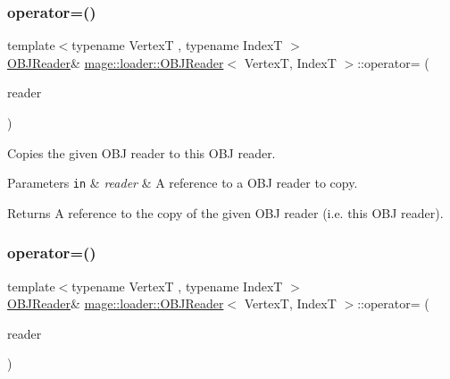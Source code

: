 \subsubsection{\texorpdfstring{operator=()}{operator=()}\hspace{0.1cm}{\footnotesize\ttfamily [1/2]}}
{\footnotesize\ttfamily template$<$typename VertexT , typename IndexT $>$ \\
\hyperlink{classmage_1_1loader_1_1_o_b_j_reader}{O\+B\+J\+Reader}\& \hyperlink{classmage_1_1loader_1_1_o_b_j_reader}{mage\+::loader\+::\+O\+B\+J\+Reader}$<$ VertexT, IndexT $>$\+::operator= (\begin{DoxyParamCaption}\item[{const \hyperlink{classmage_1_1loader_1_1_o_b_j_reader}{O\+B\+J\+Reader}$<$ VertexT, IndexT $>$ \&}]{reader }\end{DoxyParamCaption})\hspace{0.3cm}{\ttfamily [delete]}}

Copies the given O\+BJ reader to this O\+BJ reader.


\begin{DoxyParams}[1]{Parameters}
\mbox{\tt in}  & {\em reader} & A reference to a O\+BJ reader to copy. \\
\hline
\end{DoxyParams}
\begin{DoxyReturn}{Returns}
A reference to the copy of the given O\+BJ reader (i.\+e. this O\+BJ reader). 
\end{DoxyReturn}
\hypertarget{classmage_1_1loader_1_1_o_b_j_reader_a0dc19f003490ad91b6ed9ee8365e3bd4}{}\label{classmage_1_1loader_1_1_o_b_j_reader_a0dc19f003490ad91b6ed9ee8365e3bd4} 
\subsubsection{\texorpdfstring{operator=()}{operator=()}\hspace{0.1cm}{\footnotesize\ttfamily [2/2]}}
{\footnotesize\ttfamily template$<$typename VertexT , typename IndexT $>$ \\
\hyperlink{classmage_1_1loader_1_1_o_b_j_reader}{O\+B\+J\+Reader}\& \hyperlink{classmage_1_1loader_1_1_o_b_j_reader}{mage\+::loader\+::\+O\+B\+J\+Reader}$<$ VertexT, IndexT $>$\+::operator= (\begin{DoxyParamCaption}\item[{\hyperlink{classmage_1_1loader_1_1_o_b_j_reader}{O\+B\+J\+Reader}$<$ VertexT, IndexT $>$ \&\&}]{reader }\end{DoxyParamCaption})\hspace{0.3cm}{\ttfamily [delete]}}

